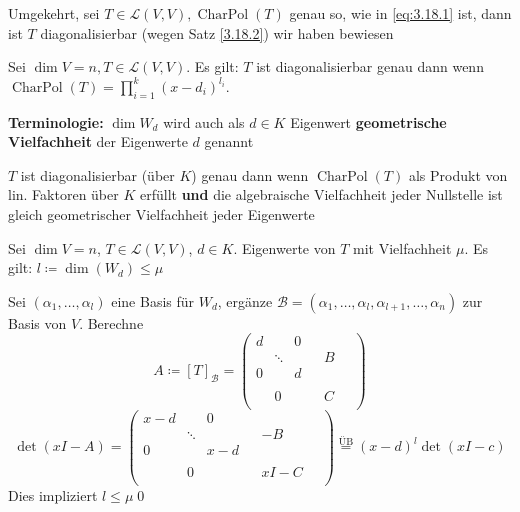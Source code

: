 Umgekehrt, sei $ T \in \mathcal{L} \left( V, V \right) , \operatorname{Char Pol}(T) $ genau so, wie in \eqref{eq:3.18.1} ist, dann ist $ T $ diagonalisierbar (wegen Satz \ref{3.18.2}) wir haben bewiesen

\begin{subtheorem}
	Sei $ \dim V = n, T \in \mathcal{L} \left( V, V \right)  $.
	Es gilt: $ T $ ist diagonalisierbar genau dann wenn $ \operatorname{Char Pol}(T) = \prod_{i = 1}^{k} (x - d_i)^{l_i}   $.

	\textbf{Terminologie:} $ \dim W_d $ wird auch als $ d \in K $ Eigenwert \textbf{geometrische Vielfachheit} der Eigenwerte $ d $ genannt

	$ T $ ist diagonalisierbar (über $ K $) genau dann wenn $ \operatorname{Char Pol}(T) $ als Produkt von lin. Faktoren über $ K $ erfüllt \textbf{und} die algebraische Vielfachheit jeder Nullstelle ist gleich geometrischer Vielfachheit jeder Eigenwerte
\end{subtheorem}

\begin{subtheorem}
	Sei $ \dim V = n $, $ T \in \mathcal{L} \left( V, V \right)  $, $ d \in K $. Eigenwerte von $ T $ mit Vielfachheit $ \mu $.
	Es gilt: $ l \coloneqq \dim \left( W_d \right) \leq \mu $
\end{subtheorem}
\begin{subproof*}
	Sei $ \left( \alpha_1, \dotsc, \alpha_l \right)  $ eine Basis für $ W_d $, ergänze $ \mathcal{B} = \left( \alpha_1, \dotsc, \alpha_l, \alpha_{l + 1} , \dotsc, \alpha_n \right)  $ zur Basis von $ V $. Berechne
	\[
		A \coloneqq [T]_{\mathcal{B} }
		= \begin{pmatrix} d & & 0 \\ & \ddots & & & B & ~ \\ 0 & & d \\ \\ & 0 & & & C \\ ~  \end{pmatrix} 
	\]
	\[
		\det(xI - A)
		= \begin{pmatrix} x - d & & 0 \\ & \ddots & & & -B & ~ \\ 0 & & x - d \\ \\ & 0 & & & xI -C \\ ~  \end{pmatrix} 
		\overset{\text{ÜB} }{=} (x - d)^{l} \det (xI - c)
	\]
	Dies impliziert $ l \leq \mu $\qed
\end{subproof*}

